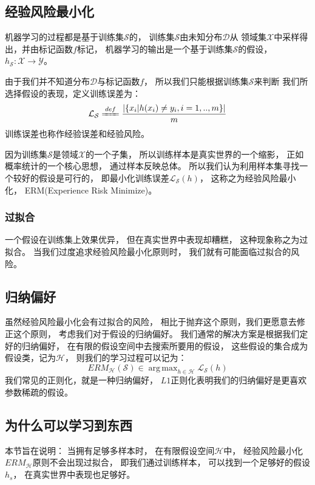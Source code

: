 \documentclass[UTF8]{ctexart}
\DeclareMathOperator*{\argmax}{arg\,max}
\begin{document}
\subsection{经验风险最小化}
机器学习的过程都是基于训练集$\mathcal{S}$的，
训练集$\mathcal{S}$由未知分布$\mathcal{D}$从
领域集$\mathcal{X}$中采样得出，并由标记函数$f$标记，
机器学习的输出是一个基于训练集$\mathcal{S}$的假设，
$h_{\mathcal{S}}:\mathcal{X}\rightarrow\mathcal{Y}$。

由于我们并不知道分布$\mathcal{D}$与标记函数$f$，
所以我们只能根据训练集$\mathcal{S}$来判断
我们所选择假设的表现，定义训练误差为：
$$
\mathcal{L}_{\mathcal{S}}\xlongequal{def}
\frac{|\{x_i|h(x_i)\neq y_i,i=1,..,m\}|}{m}
$$
训练误差也称作经验误差和经验风险。

因为训练集$\mathcal{S}$是领域$\mathcal{X}$的一个子集，
所以训练样本是真实世界的一个缩影，
正如概率统计的一个核心思想，
通过样本反映总体。
所以我们认为利用样本集寻找一个较好的假设是可行的，
即最小化训练误差$\mathcal{L}_{\mathcal{S}}(h)$，
这称之为经验风险最小化，
ERM(Experience Risk Minimize)。

\subsubsection{过拟合}
一个假设在训练集上效果优异，
但在真实世界中表现却糟糕，
这种现象称之为过拟合。
当我们过度追求经验风险最小化原则时，
我们就有可能面临过拟合的风险。

\subsection{归纳偏好}
虽然经验风险最小化会有过拟合的风险，
相比于抛弃这个原则，我们更愿意去修正这个原则，
考虑我们对于假设的归纳偏好。
我们通常的解决方案是根据我们定好的归纳偏好，
在有限的假设空间中去搜索所要用的假设，
这些假设的集合成为假设类，记为$\mathcal{H}$，
则我们的学习过程可以记为：
$$
{ERM}_{\mathcal{H}}(\mathcal{S})\in 
\argmax_{h\in\mathcal{H}}
\mathcal{L}_{\mathcal{S}}(h)
$$
我们常见的正则化，就是一种归纳偏好，
$L1$正则化表明我们的归纳偏好是更喜欢参数稀疏的假设。

\subsection{为什么可以学习到东西}
本节旨在说明：
当拥有足够多样本时，
在有限假设空间$\mathcal{H}$中，
经验风险最小化${ERM}_{\mathcal{H}}$原则不会出现过拟合，
即我们通过训练样本，
可以找到一个足够好的假设$h_s$，
在真实世界中表现也足够好。
\end{document}
